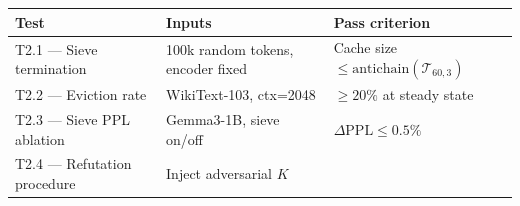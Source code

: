 \documentclass[
  11pt,
]{article}
\begin{document}
\begin{longtable}[]{@{}lll@{}}
\toprule
\begin{minipage}[b]{0.18\columnwidth}\raggedright
Test\strut
\end{minipage} & \begin{minipage}[b]{0.24\columnwidth}\raggedright
Inputs\strut
\end{minipage} & \begin{minipage}[b]{0.49\columnwidth}\raggedright
Pass criterion\strut
\end{minipage}\tabularnewline
\midrule
\endhead
\begin{minipage}[t]{0.18\columnwidth}\raggedright
T2.1 --- Sieve termination\strut
\end{minipage} & \begin{minipage}[t]{0.24\columnwidth}\raggedright
100k random tokens, encoder fixed\strut
\end{minipage} & \begin{minipage}[t]{0.49\columnwidth}\raggedright
Cache size \(\le \mathrm{antichain}(\mathcal{T}_{60,3})\)\strut
\end{minipage}\tabularnewline
\begin{minipage}[t]{0.18\columnwidth}\raggedright
T2.2 --- Eviction rate\strut
\end{minipage} & \begin{minipage}[t]{0.24\columnwidth}\raggedright
WikiText-103, ctx=2048\strut
\end{minipage} & \begin{minipage}[t]{0.49\columnwidth}\raggedright
\(\ge 20\%\) at steady state\strut
\end{minipage}\tabularnewline
\begin{minipage}[t]{0.18\columnwidth}\raggedright
T2.3 --- Sieve PPL ablation\strut
\end{minipage} & \begin{minipage}[t]{0.24\columnwidth}\raggedright
Gemma3-1B, sieve on/off\strut
\end{minipage} & \begin{minipage}[t]{0.49\columnwidth}\raggedright
\(\Delta\text{PPL} \le 0.5\%\)\strut
\end{minipage}\tabularnewline
\begin{minipage}[t]{0.18\columnwidth}\raggedright
T2.4 --- Refutation procedure\strut
\end{minipage} & \begin{minipage}[t]{0.24\columnwidth}\raggedright
Inject adversarial \(K\)\strut
\end{minipage} & \begin{minipage}[t]{0.49\columnwidth}\raggedright

\end{minipage}
\end{longtable}
\end{document}
